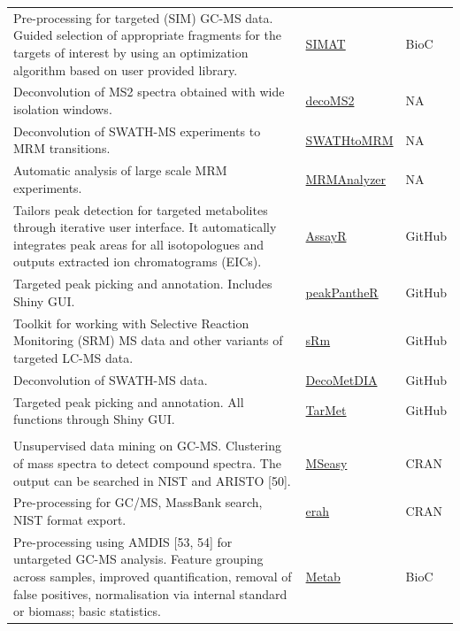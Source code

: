 \documentclass[]{article}
\begin{document}
\begin{longtable}{>{\raggedright\arraybackslash}p{30em}>{\raggedright\arraybackslash}p{10em}>{\raggedright\arraybackslash}p{3em}}
Pre-processing for targeted (SIM) GC-MS data. Guided selection of appropriate fragments for the targets of interest by using an optimization algorithm based on user provided library. & \href{https://doi.org/doi:10.18129/B9.bioc.SIMAT}{SIMAT} & BioC\\
\rowcolor{gray!6}  Deconvolution of MS2 spectra obtained with wide isolation windows. & \href{http://pattilab.wustl.edu/software/decoms2/decoms2.php}{decoMS2} & NA\\
Deconvolution of SWATH-MS experiments to MRM transitions. & \href{http://www.metabolomics-shanghai.org/softwaredetail.php?id=128}{SWATHtoMRM} & NA\\
\rowcolor{gray!6}  Automatic analysis of large scale MRM experiments. & \href{http://www.metabolomics-shanghai.org/softwaredetail.php?id=34}{MRMAnalyzer} & NA\\
Tailors peak detection for targeted metabolites through iterative user interface. It automatically integrates peak areas for all isotopologues and outputs extracted ion chromatograms (EICs). & \href{https://github.com/stevehoang/assayr}{AssayR} & GitHub\\
\rowcolor{gray!6}  Targeted peak picking and annotation. Includes Shiny GUI. & \href{https://github.com/phenomecentre/peakPantheR}{peakPantheR} & GitHub\\
Toolkit for working with Selective Reaction Monitoring (SRM) MS data and other variants of targeted LC-MS data. & \href{https://github.com/wilsontom/sRm}{sRm} & GitHub\\
\rowcolor{gray!6}  Deconvolution of SWATH-MS data. & \href{https://github.com/ZhuMSLab/DecoMetDIA}{DecoMetDIA} & GitHub\\
Targeted peak picking and annotation. All functions through Shiny GUI. & \href{https://github.com/hcji/TarMet}{TarMet} & GitHub\\
\rowcolor{gray!6}  \addlinespace[0.3em]
\multicolumn{3}{l}{\textbf{GC-MS and GC×GC-MS}}\\
Unsupervised data mining on GC-MS. Clustering of mass spectra to detect compound spectra. The output can be searched in NIST and ARISTO [50]. & \href{https://cran.r-project.org/package=MSeasy}{MSeasy} & CRAN\\
Pre-processing for GC/MS, MassBank search, NIST format export. & \href{https://cran.r-project.org/package=erah}{erah} & CRAN\\
\rowcolor{gray!6}  Pre-processing using AMDIS [53, 54] for untargeted GC-MS analysis. Feature grouping across samples, improved quantification, removal of false positives, normalisation via internal standard or biomass; basic statistics. & \href{https://doi.org/doi:10.18129/B9.bioc.Metab}{Metab} & BioC\\

\end{longtable}
\end{document}
